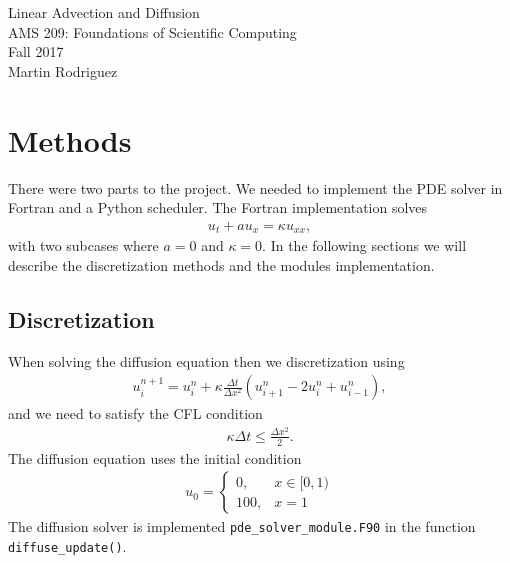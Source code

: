 \documentclass[12pt]{article}
\begin{document}
\begin{center}
	{\LARGE Linear Advection and Diffusion} \\[10pt] 
	AMS 209: Foundations of Scientific Computing\\
	Fall 2017 \\
	{Martin Rodriguez} \\
\end{center}

\begin{abstract}
	The goal of this project to use model a one-dimensional advection and diffusion equation numerically. For diffusion we used a centered spatial discretization and forward time. In the case of advection, we continue to use forward time and use both an backward space also called upwind and a centered difference. The code is tested on a grid size of $N= 32$ and $N=128$ for the diffusion, advection, and the advection-diffusion case. The upwind method provides the best solution for the advection partial differential equation (PDE) and the center finite difference method solutions explodes eventually. However, when viscosity is added then the center method resolves the PDE. 
\end{abstract}

\newpage

\section{Methods}

	There were two parts to the project. We needed to implement the PDE solver in Fortran and a Python scheduler. The Fortran implementation solves
	\begin{align}
		u_t + au_x = \kappa u_{xx},
	\end{align}
	with two subcases where $a = 0$ and $\kappa = 0$. In the following sections we will describe the discretization methods and the modules implementation.

	\subsection{Discretization}
		When solving the diffusion equation then we discretization using
		\begin{align}
			u_i^{n+1} = u_i^n + \kappa \frac{\Delta t}{\Delta x^2} ( u_{i+1}^n - 2u_i^n + u_{i-1}^n ), 
		\end{align}
		and we need to satisfy the CFL condition
		\begin{align*}
			\kappa \Delta t \leq \frac{\Delta x^2}{2}.
		\end{align*}
		The diffusion equation uses the initial condition
		\begin{align*}
			u_0 = \begin{cases}0 , & x\in [0,1) \\ 100 , & x = 1 \end{cases}
		\end{align*}
		The diffusion solver is implemented \texttt{pde\_solver\_module.F90} in the function \texttt{diffuse\_update()}.
		
\end{document}
